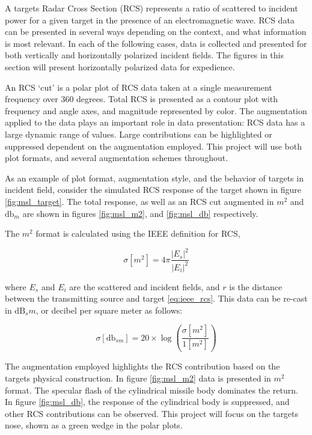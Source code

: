 	A targets Radar Cross Section (RCS) represents a ratio of scattered to incident power for a given target in the presence of an electromagnetic wave. RCS data can be presented in several ways depending on the context, and what information is most relevant. In each of the following cases, data is collected and presented for both vertically and horizontally polarized incident fields. The figures in this section will present horizontally polarized data for expedience.

	An RCS `cut' is a polar plot of RCS data taken at a single measurement frequency over 360 degrees. Total RCS is presented as a contour plot with frequency and angle axes, and magnitude represented by color. The augmentation applied to the data plays an important role in data presentation:  RCS data has a large dynamic range of values. Large contributions can be highlighted or suppressed dependent on the augmentation employed. This project will use both plot formats, and several augmentation schemes throughout.

	As an example of plot format, augmentation style, and the behavior of targets in incident field, consider the simulated RCS response of the target shown in figure \ref{fig:msl_target}. The total response, as well as an RCS cut augmented in $m^2$ and $\textrm{db}_m$ are shown in figures \ref{fig:msl_m2}, and \ref{fig:msl_db} respectively.

	The $m^2$ format is calculated using the IEEE definition for RCS,

	\begin{equation}\label{eq:ieee_rcs}
			\sigma [m^2] = 4\pi \frac{|E_{s}|^2}{|E_{i}|^2}
	\end{equation}

	where $E_s$ and $E_i$ are the scattered and incident fields, and $r$ is the distance between the transmitting source and target \ref{eq:ieee_rcs}\cite{Knott}. This data can be re-cast in $\textrm{dB}_sm$, or decibel per square meter as follows:

	\begin{equation}\label{eq:ieee_dbsm}
			\sigma [\textrm{db}_{sm}] = 20\times \log\left( \frac{\sigma [m^2]}{1 [m^2]}\right)
	\end{equation}

	The augmentation employed highlights the RCS contribution based on the targets physical construction. In figure \ref{fig:msl_m2} data is presented in $m^2$ format. The specular flash of the cylindrical missile body dominates the return. In figure \ref{fig:msl_db}, the response of the cylindrical body is suppressed, and other RCS contributions can be observed. This project will focus on the targets nose, shown as a green wedge in the polar plots.

